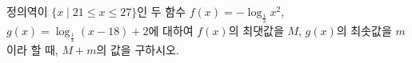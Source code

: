 정의역이 $\{x \mid 21\le x\le 27\}$인 두 함수 $f(x)=-\log_{\frac{1}{3}} x^2$, $g(x)=\log_{\frac{1}{3}} (x-18)+2$에 대하여 $f(x)$의 최댓값을 $M$, $g(x)$의 최솟값을 $m$이라 할 때, $M+m$의 값을 구하시오.

